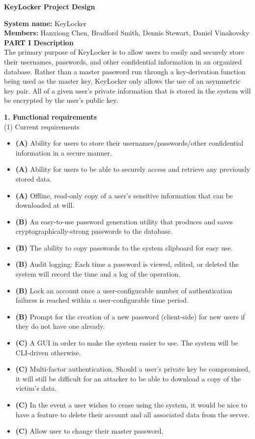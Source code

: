 \documentclass[11pt, letterpaper]{article}
\newcommand{\DesignSection}[1]
{\noindent\textbf{#1}\\}
\begin{document}
\centerline{\textbf{KeyLocker Project Design}}
\smallskip
\noindent\textbf{System name: }KeyLocker\\
\noindent\textbf{Members: }Hanxiong Chen, Bradford Smith, Dennis Stewart, Daniel Vinakovsky\\

\DesignSection{PART I Description}
\noindent
The primary purpose of KeyLocker is to allow users to easily and securely store their usernames, passwords, and other confidential information in an organized database. Rather than a master password run through a key-derivation function being used as the master key, KeyLocker only allows the use of an asymmetric key pair. All of a given user's private information that is stored in the system will be encrypted by the user's public key.

\DesignSection{1. Functional requirements}
\smallskip
\noindent(1) Current requirements
\begin{itemize} \itemsep1pt \parskip0pt 
    \item \textbf{(A) }Ability for users to store their usernames/passwords/other confidential information in a secure manner.
    \item \textbf{(A) }Ability for users to be able to securely access and retrieve any previously stored data.
    \item \textbf{(A) }Offline, read-only copy of a user's sensitive information that can be downloaded at will.
    \item \textbf{(B) }An easy-to-use password generation utility that produces and saves cryptographically-strong passwords to the database.
    \item \textbf{(B) }The ability to copy passwords to the system clipboard for easy use.
    \item \textbf{(B) }Audit logging: Each time a password is viewed, edited, or deleted the system will record the time and a log of the operation.
    \item \textbf{(B) }Lock an account once a user-configurable number of authentication failures is reached within a user-configurable time period.
    \item \textbf{(B) }Prompt for the creation of a new password (client-side) for new users if they do not have one already.
    \item \textbf{(C) }A \ac{GUI} in order to make the system easier to use. The system will be \ac{CLI}-driven otherwise.
    \item \textbf{(C) }Multi-factor authentication. Should a user's private key be compromised, it will still be difficult for an attacker to be able to download a copy of the victim's data.
    \item \textbf{(C) }In the event a user wishes to cease using the system, it would be nice to have a feature to delete their account and all associated data from the server.
    \item \textbf{(C) }Allow user to change their master password.
\end{itemize}
\end{document}
